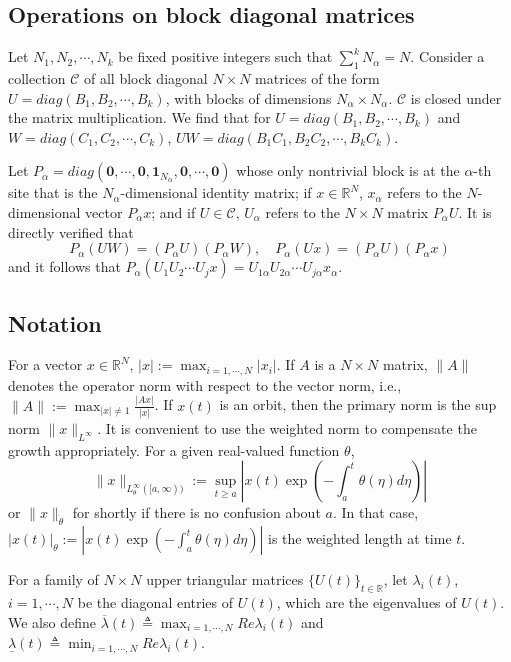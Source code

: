 \documentclass[a4paper,11pt]{article}
\newcommand{\upl}{\overline{\lambda}}
\newcommand{\udl}{\underline{\lambda}}
\newcommand{\CC}{\mathcal{C}}
\theoremstyle{remark}
\begin{document}
\subsection{Operations on block diagonal matrices}

Let $N_1,N_2, \cdots, N_k$ be fixed positive integers such that $\displaystyle\sum_1^k N_\alpha = N$. Consider a collection $\CC$ of all block diagonal $N\times N$ matrices of the form $U = diag(B_1,B_2, \cdots,B_k)$, with blocks of dimensions $N_\alpha\times N_\alpha$. $\CC$ is closed under the matrix multiplication. We find that for $U = diag(B_1,B_2, \cdots,B_k)$ and $W = diag(C_1,C_2, \cdots,C_k)$, $UW = diag(B_1C_1, B_2C_2,\cdots,B_kC_k)$. %


Let $P_\alpha=diag(\mathbf{0},\cdots,\mathbf{0},\mathbf{1}_{N_\alpha},\mathbf{0},\cdots,\mathbf{0})$ whose only nontrivial block is at the $\alpha$-th site that is the $N_\alpha$-dimensional identity matrix; if $x\in \mathbb{R}^N$, $x_\alpha$ refers to the $N$-dimensional vector $P_\alpha x$; and if $U\in \CC$, $U_\alpha$ refers to the $N\times N$ matrix $P_\alpha U$. It is directly verified that 
$$P_\alpha (UW) = (P_\alpha U) (P_\alpha W), \quad P_\alpha (U x) = (P_\alpha U) (P_\alpha x)$$
and it follows that $P_\alpha(U_1U_2\cdots U_j x) = U_{1\alpha}U_{2\alpha}\cdots U_{j\alpha} x_\alpha.$

\subsection{Notation} \label{sec:notation}
For a vector $x \in \mathbb{R}^N$, $|x|:=\displaystyle\max_{i=1,\cdots,N} |x_i|$. If $A$ is a $N\times N$ matrix, $\|A\|$ denotes the operator norm with respect to the vector norm, i.e., $\|A\|:= \displaystyle\max_{|x|\ne 1} \frac{ |Ax|}{|x|}$. If $x(t)$ is an orbit, then the primary norm is the sup norm $\|x\|_{L^\infty}$. It is convenient to use the weighted norm to compensate the growth appropriately. For  a given real-valued function $\theta$, $$\displaystyle\|x\|_{L^\infty_\theta([a,\infty))} := \sup_{t\ge a} \left|x(t) \exp\left( -\int_a^t \theta(\eta) d\eta\right)\right|$$ or $\|x\|_\theta$ for shortly if there is no confusion about $a$. In that case, $|x(t)|_\theta := \left|x(t) \exp\left( -\int_a^t \theta(\eta) d\eta\right)\right|$ is the weighted length at time $t$. 

For  a family of $N\times N$ upper triangular matrices $\{U(t)\}_{t\in \mathbb{R}}$, let $\lambda_i(t)$, $i=1,\cdots,N$ be the diagonal entries of $U(t)$, which are the eigenvalues of $U(t)$. We also define $\displaystyle\upl(t)\triangleq \max_{i=1,\cdots,N} Re \lambda_i(t)$ and $\displaystyle \udl(t)\triangleq \min_{i=1,\cdots,N} Re \lambda_i(t)$. 
\end{document}
